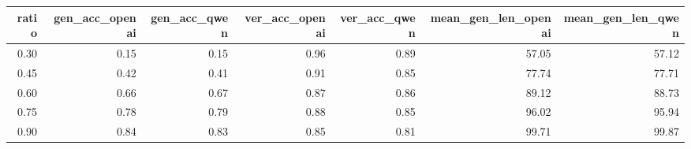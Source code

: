 \begin{tabular}{rrrrrrr}
\toprule
ratio & gen_acc_openai & gen_acc_qwen & ver_acc_openai & ver_acc_qwen & mean_gen_len_openai & mean_gen_len_qwen \\
\midrule
0.30 & 0.15 & 0.15 & 0.96 & 0.89 & 57.05 & 57.12 \\
0.45 & 0.42 & 0.41 & 0.91 & 0.85 & 77.74 & 77.71 \\
0.60 & 0.66 & 0.67 & 0.87 & 0.86 & 89.12 & 88.73 \\
0.75 & 0.78 & 0.79 & 0.88 & 0.85 & 96.02 & 95.94 \\
0.90 & 0.84 & 0.83 & 0.85 & 0.81 & 99.71 & 99.87 \\
\bottomrule
\end{tabular}
